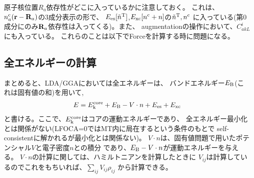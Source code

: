 \documentclass[a4paper,10pt,aip,onecolumn,amsmath,amssymb,floatfix,rmp]{revtex4-1}
\newcommand{\bfr}{{\bf r}}
\newcommand{\bfR}{{\bf R}}
\newcommand{\req}[1]{\mbox{Eq.~\!(\ref{#1})}}
\def\tnT{\tilde{n}^{\rm T}}
\def\tnT{\tilde{n}^{\rm T}}
\begin{document}




原子核位置$R_a$依存性がどこに入っているかに注意しておく。
これは、$n^{\rm c}_a(\bfr-\bfR_a)$の3成分表示の形で、
$E_{\rm es}[\tnT]$,$E_{\rm xc}[n^{\rm c}+n]$の$\tnT,n^{\rm c}$
に入っている(第0成分にのみ$\bfR_a$依存性は入ってくる)。また、
augmentationの操作において、$C^{i}_{akL}$にも入っている。
これらのことは以下でForceを計算する時に問題になる。


\subsection{全エネルギーの計算}
まとめると、LDA/GGAにおいては全エネルギーは、
バンドエネルギー$E_{\rm B}$(これは固有値の和)を用いて,
\begin{eqnarray}
E = E_{\rm k}^{\rm core} + E_{\rm B} - V \cdot n + E_{\rm es} + E_{\rm xc}
\label{etot}
\end{eqnarray}
と書ける。ここで、$E_{\rm k}^{\rm core}$はコアの運動エネルギーであり、
全エネルギー最小化とは関係がない(LFOCA=0ではMT内に局在するという条件のもとで
self-consistentに解かれるが最小化とは関係ない)。
$V \cdot n$は、固有値問題で用いたポテンシャル$V$と電子密度$n$との積分
であり、$E_{\rm B} - V \cdot n$が運動エネルギーを与える。
$V \cdot n$の計算に関しては、ハミルトニアンを計算したときに
$V_{ij}$は計算しているのでこれをもちいれば、$\sum_{ij}V_{ij}\rho_{ij}$
から計算できる。
\end{document}
